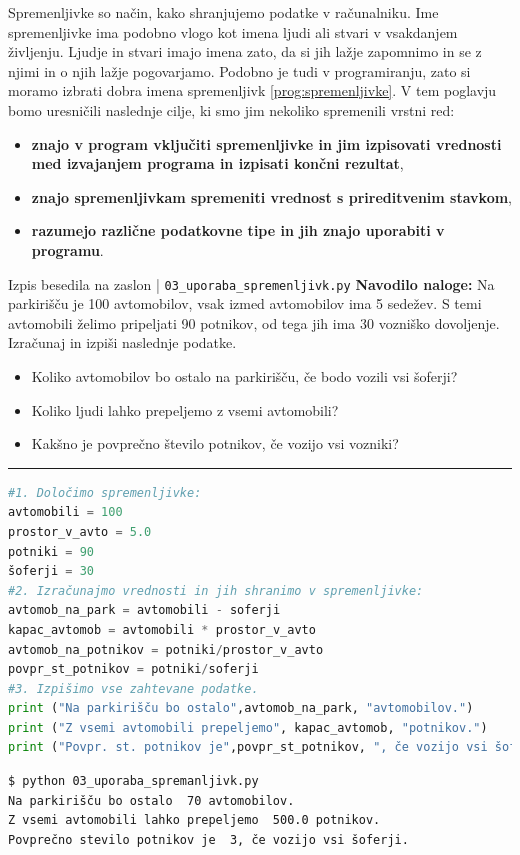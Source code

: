 Spremenljivke so način, kako shranjujemo podatke v računalniku. Ime
spremenljivke ima podobno vlogo kot imena ljudi ali stvari v vsakdanjem
življenju. Ljudje in stvari imajo imena zato, da si jih lažje zapomnimo in se z
njimi in o njih lažje pogovarjamo. Podobno je tudi v programiranju, zato si
moramo izbrati dobra imena spremenljivk \ref{prog:spremenljivke}. V tem poglavju
bomo uresničili naslednje cilje, ki smo jim nekoliko spremenili vrstni red:
\begin{itemize}
\tightlist
\item \textbf{znajo v program vključiti spremenljivke in jim izpisovati
    vrednosti med izvajanjem programa in izpisati končni rezultat},
\item \textbf{znajo spremenljivkam spremeniti vrednost s prireditvenim
  stavkom},
\item \textbf{ razumejo različne podatkovne tipe in jih znajo uporabiti v
  programu}.
\end{itemize}

\begin{examplebox}[label={prog:spremenljivke}]{Izpis besedila na
    zaslon | \texttt{03\_uporaba\_spremenljivk.py} \cite{web:PTHardWay}}
  \textbf{Navodilo naloge:} Na parkirišču je 100 avtomobilov, vsak izmed
  avtomobilov ima 5 sedežev. S temi avtomobili želimo pripeljati 90 potnikov, od
  tega jih ima 30 vozniško dovoljenje. Izračunaj in izpiši naslednje podatke.
\begin{itemize}
\item Koliko avtomobilov bo ostalo na parkirišču, če bodo vozili vsi
  šoferji?
\item Koliko ljudi lahko prepeljemo z vsemi avtomobili?
\item Kakšno je povprečno število potnikov, če vozijo vsi vozniki?
\end{itemize}
\rule{\textwidth}{.4pt}
\begin{lstlisting}[language=Python]
#1. Določimo spremenljivke:
avtomobili = 100
prostor_v_avto = 5.0
potniki = 90
šoferji = 30
#2. Izračunajmo vrednosti in jih shranimo v spremenljivke:
avtomob_na_park = avtomobili - soferji
kapac_avtomob = avtomobili * prostor_v_avto
avtomob_na_potnikov = potniki/prostor_v_avto
povpr_st_potnikov = potniki/soferji
#3. Izpišimo vse zahtevane podatke.
print ("Na parkirišču bo ostalo",avtomob_na_park, "avtomobilov.")
print ("Z vsemi avtomobili prepeljemo", kapac_avtomob, "potnikov.")
print ("Povpr. st. potnikov je",povpr_st_potnikov, ", če vozijo vsi šoferji.")
\end{lstlisting}
\tcblower
\begin{Verbatim}[fontsize=\footnotesize]
$ python 03_uporaba_spremanljivk.py
Na parkirišču bo ostalo  70 avtomobilov.
Z vsemi avtomobili lahko prepeljemo  500.0 potnikov.
Povprečno stevilo potnikov je  3, če vozijo vsi šoferji.
\end{Verbatim}
\end{examplebox}

